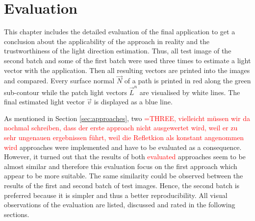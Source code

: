 \section{Evaluation} \label{sec:Evaluation}
This chapter includes the detailed evaluation of the final application to get a conclusion about the applicability of the approach in reality and the trustworthiness of the light direction estimation. Thus, all test image of the second batch and some of the first batch were used three times to estimate a light vector with the application. Then all resulting vectors are printed into the images and compared. Every surface normal $\vec{N}$ of a path is printed in red along the green sub-contour while the patch light vectors $\vec{L}^n$ are visualised by white lines. The final estimated light vector $\vec{v}$ is displayed as a blue line. 

As mentioned in Section \ref{sec:approaches}, two \textcolor{red}{=THREE, vielleicht müssen wir da nochmal schreiben, dass der erste approach nicht ausgewertet wird, weil er zu sehr ungenauen ergebnissen führt, weil die Refletkion als konstant angenommen wird} approaches were implemented and have to be evaluated as a consequence. However, it turned out that the results of both \textcolor{red}{evaluated} approaches seem to be almost similar and therefore this evaluation focus on the first approach which appear to be more suitable. The same similarity could be observed between the results of the first and second batch of test images. Hence, the second batch is preferred because it is simpler and thus a better reproducibility. All visual observations of the evaluation are listed, discussed and rated in the following sections.

